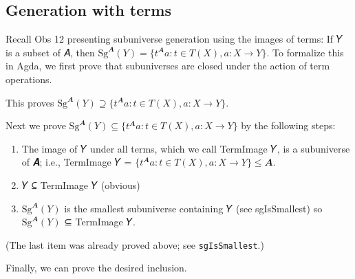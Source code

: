 \documentclass[a4paper,USenglish,cleveref,autoref,thm-restate]{lipics-v2019}
\begin{document}
\subsection{Generation with terms}\label{generation-with-terms}
Recall Obs 12 presenting subuniverse generation using the images of terms: If 𝑌 is a subset of 𝐴, then \(\mathrm{Sg}^𝑨(Y) = \{t^𝑨 a : t ∈ T(X), a : X → Y\}\). To formalize this in Agda, we first prove that subuniverses are closed under the action of term operations.
\begin{code}\end{code}
This proves \(\mathrm{Sg}^𝑨(Y) ⊇ \{ t^𝑨 a : t ∈ 𝑇(𝑋), a : 𝑋 → 𝑌 \}\).

Next we prove \(\mathrm{Sg}^𝑨(Y) ⊆ \{ t^𝑨 a : t ∈ 𝑇(𝑋), a : 𝑋 → 𝑌 \}\) by the following steps:
\begin{enumerate}
\item The image of 𝑌 under all terms, which we call TermImage 𝑌, is a subuniverse of 𝑨; i.e., TermImage 𝑌 =
  \(\{ t^𝑨 a : t ∈ 𝑇(𝑋), a : 𝑋 → 𝑌 \} ≤ 𝑨\).
\item 𝑌 ⊆ TermImage 𝑌 (obvious)
\item \(\mathrm{Sg}^𝑨(Y)\) is the smallest subuniverse containing 𝑌 (see sgIsSmallest) so \(\mathrm{Sg}^𝑨(Y)\) ⊆ TermImage 𝑌.
\end{enumerate}
\noindent (The last item was already proved above; see \texttt{sgIsSmallest}.)
\begin{code}\end{code}
Finally, we can prove the desired inclusion.
\begin{code}
\\[\AgdaEmptyExtraSkip]%
\>[1]\AgdaSpace{}%
\AgdaSymbol{:}\AgdaSpace{}%
\AgdaSymbol{(}\AgdaSpace{}%
\AgdaSymbol{:}\AgdaSpace{}%
\AgdaSpace{}%
\AgdaSpace{}%
\AgdaSpace{}%
\AgdaSpace{}%
\AgdaSymbol{)}\AgdaSpace{}%
\AgdaSpace{}%
\AgdaSpace{}%
\AgdaSpace{}%
\AgdaSpace{}%
\AgdaSpace{}%
\<%
\\
%
\>[1]\AgdaSpace{}%
\AgdaSpace{}%
\AgdaSymbol{=}\AgdaSpace{}%
%
\>[775I]\AgdaSymbol{(}\AgdaSpace{}%
\AgdaSymbol{)}\<%
\\
\>[.][@{}l@{}]\<[775I]%
\>[33]\AgdaSymbol{(}\AgdaSpace{}%
\AgdaSymbol{)}\<%
\end{code}
\end{document}
